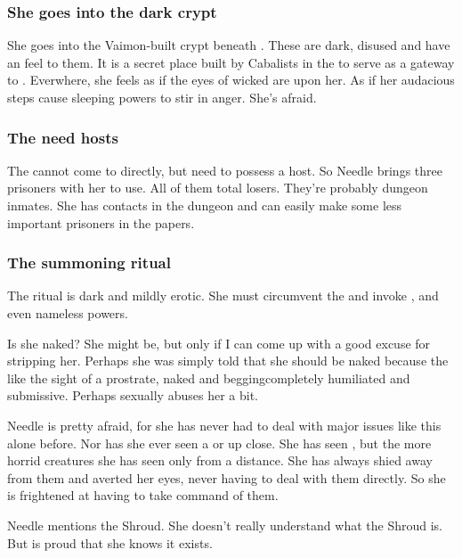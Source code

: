 \subsubsection{She goes into the dark crypt}
She goes into the Vaimon-built crypt beneath \CastlePelidor. 
These are dark, disused and have an  feel to them. 
It is a secret place built by Cabalists in the \VaimonCaliphate to serve as a gateway to \Nyx. 
Everwhere, she feels as if the eyes of wicked \Qliphoth{} are upon her. 
As if her audacious steps cause sleeping powers to stir in anger. 
She's afraid. 





\subsubsection{The \banes{} need \human{} hosts}
The \banes{} cannot come to \Miith{} directly, but need to possess a \human{} host. 
So Needle brings three prisoners with her to use. 
All of them total losers. 
They're probably dungeon inmates. 
She has contacts in the dungeon and can easily make some less important prisoners  in the papers. 





\subsubsection{The summoning ritual}
The ritual is dark and mildly erotic. 
She must circumvent the \Sephiroth{} and invoke \Qliphoth{}, and even nameless powers. 

Is she naked? 
She might be, but only if I can come up with a good excuse for stripping her. 
Perhaps she was simply told that she should be naked because the \resphain{} like the sight of a \human{} prostrate, naked and begging\dash completely humiliated and submissive. 
Perhaps \Achsah{} sexually abuses her a bit. 

Needle is pretty afraid, for she has never had to deal with major issues like this alone before. 
Nor has she ever seen a \bane{} or \banerat{} up close. 
She has seen \resphain, but the more horrid creatures she has seen only from a distance. 
She has always shied away from them and averted her eyes, never having to deal with them directly. So she is frightened at having to take command of them. 

Needle mentions the Shroud. 
She doesn't really understand what the Shroud is. 
But is proud that she knows it exists. 





